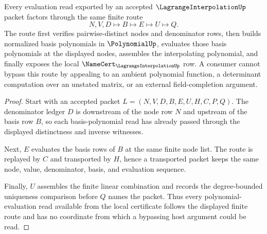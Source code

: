 \begin{theorem}
\label{thm:lagrange-interpolation-polynomial-evaluation-route}
Every evaluation read exported by an accepted $\LagrangeInterpolationUp$
packet factors through the same finite route
$$
N,V,D \longmapsto B \longmapsto E \longmapsto U \longmapsto Q .
$$
The route first verifies pairwise-distinct nodes and denominator rows, then
builds normalized basis polynomials in $\PolynomialUp$, evaluates those basis
polynomials at the displayed nodes, assembles the interpolating polynomial, and
finally exposes the local $\NameCert_{\LagrangeInterpolationUp}$ row. A
consumer cannot bypass this route by appealing to an ambient polynomial
function, a determinant computation over an unstated matrix, or an external
field-completion argument.
\end{theorem}
\begin{proof}
Start with an accepted packet
$L=(N,V,D,B,E,U,H,C,P,Q)$. The denominator ledger $D$ is downstream of the
node row $N$ and upstream of the basis row $B$, so each basis-polynomial read
has already passed through the displayed distinctness and inverse witnesses.

Next, $E$ evaluates the basis rows of $B$ at the same finite node list. The
route is replayed by $C$ and transported by $H$, hence a transported packet
keeps the same node, value, denominator, basis, and evaluation sequence.

Finally, $U$ assembles the finite linear combination and records the
degree-bounded uniqueness comparison before $Q$ names the packet. Thus every
polynomial-evaluation read available from the local certificate follows the
displayed finite route and has no coordinate from which a bypassing host
argument could be read.
\end{proof}



